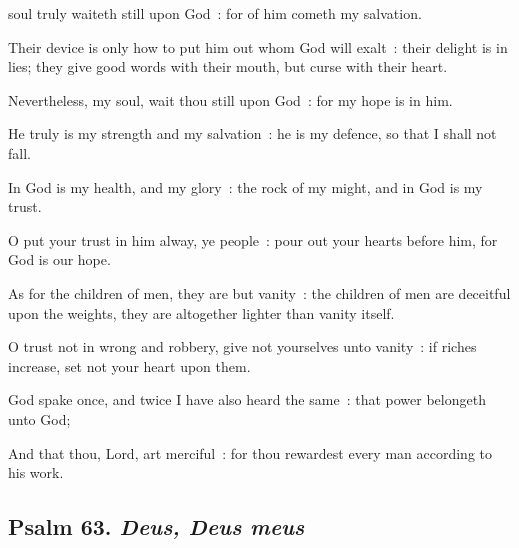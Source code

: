  soul truly waiteth still upon God~: for of him cometh my salvation.\par
{}
Their device is only how to put him out whom God will exalt~: their delight is in lies; they give good words with their mouth, but curse with their heart.\par
{}Nevertheless, my soul, wait thou still upon God~: for my hope is in him.\par
{}He truly is my strength and my salvation~: he is my defence, so that I shall not fall.\par
{}In God is my health, and my glory~: the rock of my might, and in God is my trust.\par
{}O put your trust in him alway, ye people~: pour out your hearts before him, for God is our hope.\par
{}As for the children of men, they are but vanity~: the children of men are deceitful upon the weights, they are altogether lighter than vanity itself.\par
{}O trust not in wrong and robbery, give not yourselves unto vanity~: if riches increase, set not your heart upon them.\par
{}God spake once, and twice I have also heard the same~: that power belongeth unto God;\par
{}And that thou, Lord, art merciful~: for thou rewardest every man according to his work.\par

\subsection{Psalm 63. \textit{Deus, Deus meus}}


